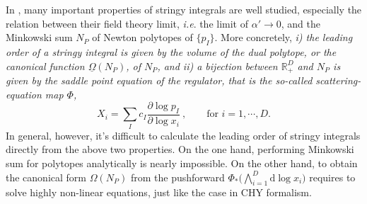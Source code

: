 \documentclass[12pt]{article}
\theoremstyle{definition}
\theoremstyle{plain}
\newcommand{\dif}{\mathrm{d}} %
\begin{document}


In \cite{Arkani-Hamed:2019mrd}, many important properties of stringy integrals are well studied, especially the relation between their field theory limit, {\it{i.e}}. the limit of $\alpha'\to 0$, and the Minkowski sum $N_{P}$ of Newton polytopes of $\{p_I\}$.
More concretely, {\it{ i) the leading order of a stringy integral is given by the volume of the dual polytope, or the canonical function $\underline{\Omega}(N_{P})$, of $N_{P}$, and ii) a bijection between $\mathds{R}_{+}^{D}$ and $N_{P}$ is given by the saddle point equation of the regulator, that is the so-called scattering-equation map $\Phi$,}}
\begin{equation} \label{SEmap}
	X_{i}= \sum_{I}c_{I}\frac{\partial \log p_{I}}{\partial \log x_{i}}\:, \qquad  \text{for }i=1,\cdots,D.
\end{equation}	
In general, however, it's difficult to calculate the leading order of stringy integrals directly from the above two properties.
On the one hand, performing Minkowski sum for polytopes analytically is nearly impossible. On the other hand, to obtain the canonical form $\Omega(N_{P})$ from the pushforward $\Phi_{\ast}\bigl(\bigwedge_{i=1}^{D} \dif \log x_{i}\bigr)$ requires to solve highly non-linear equations, just like the case in CHY formalism.
\end{document}
